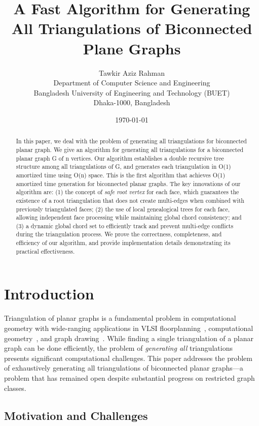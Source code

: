 \documentclass[12pt,a4paper]{article}
\title{A Fast Algorithm for Generating All Triangulations of Biconnected Plane Graphs}
\author{Tawkir Aziz Rahman\\
Department of Computer Science and Engineering\\
Bangladesh University of Engineering and Technology (BUET)\\
Dhaka-1000, Bangladesh}
\date{\today}
\theoremstyle{definition}
\theoremstyle{remark}
\begin{document}
\maketitle

\begin{abstract}
In this paper, we deal with the problem of generating all triangulations for biconnected planar graph. We give an algorithm for generating all triangulations for a biconnected planar graph G of n vertices. Our algorithm establishes a double recursive tree structure among all triangulations of G, and generates each triangulation in O(1) amortized time using O(n) space. This is the first algorithm that achieves O(1) amortized time generation for biconnected planar graphs. The key innovations of our algorithm are: (1) the concept of \emph{safe root vertex} for each face, which guarantees the existence of a root triangulation that does not create multi-edges when combined with previously triangulated faces; (2) the use of local genealogical trees for each face, allowing independent face processing while maintaining global chord consistency; and (3) a dynamic global chord set to efficiently track and prevent multi-edge conflicts during the triangulation process. We prove the correctness, completeness, and efficiency of our algorithm, and provide implementation details demonstrating its practical effectiveness.
\end{abstract}

\section{Introduction}

Triangulation of planar graphs is a fundamental problem in computational geometry with wide-ranging applications in VLSI floorplanning~\cite{kozminski1985}, computational geometry~\cite{berg2008}, and graph drawing~\cite{nishizeki2004}. While finding a single triangulation of a planar graph can be done efficiently, the problem of \emph{generating all} triangulations presents significant computational challenges. This paper addresses the problem of exhaustively generating all triangulations of biconnected planar graphs—a problem that has remained open despite substantial progress on restricted graph classes.

\subsection{Motivation and Challenges}
\end{document}
